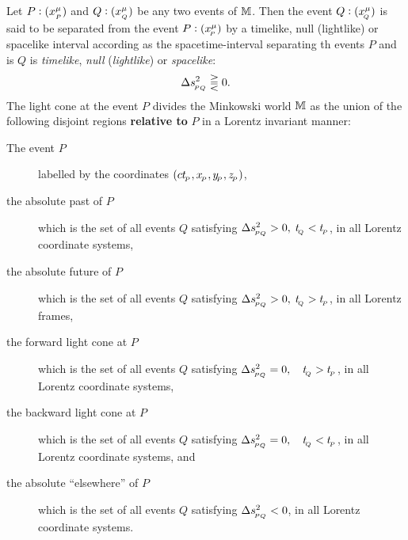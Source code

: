Let $P:(x^{{\mu}}_{_P})$  and $Q:(x^{{\mu}}_{_Q})$ be any two 
events of $\mathbb{M}$. Then the event $Q: (x^{{\mu}}_{_{\hspace*{-1.5pt}{Q}}})$ is 
said to be separated from the event $P: (x^{{\mu}}_{_{\hspace*{-1.5pt}{P}}}) $ 
by a {timelike}, {null (lightlike)} or {spacelike} interval 
according as the spacetime-interval separating  th events  
$P$ and is  $Q$ is \textsl{timelike}, \textsl{null} 
(\textsl{lightlike}) or \textsl{spacelike}:
\begin{align}\label{mw.25} 
\Delta s_{_{\hspace*{-1.5pt}{PQ}}}^2 \gtreqqless 0.
\end{align} 
The light cone at the event $P$ divides the 
Minkowski world $\mathbb{M}$ as the union of the following 
disjoint regions\textbf{ relative to} $P$ in a Lorentz 
invariant manner:

\begin{description}

\item [The event $P$] labelled by the coordinates 
$(ct_{_{\hspace*{-1.5pt}{P}}},x_{_{\hspace*{-1.5pt}{P}}},y_{_{\hspace*{-1.5pt}{P}}},z_{_{\hspace*{-1.5pt}{P}}})$, 

\item [the absolute past of $P$]  which is the set of all events $Q$   satisfying  
$\Delta s_{_{\hspace*{-1.5pt}{PQ}}}^2 > 0,\; t_{_{\hspace*{-1.5pt}{Q}}}< t_{_{\hspace*{-1.5pt}{P}}}$, in all 
Lorentz  coordinate systems,

\item [the absolute future  of $P$]  which is the set of all events $Q$ 
satisfying  $\Delta s_{_{\hspace*{-1.5pt}{PQ}}}^2 > 0,\; t_{_{\hspace*{-1.5pt}{Q}}}> 
t_{_{\hspace*{-1.5pt}{P}}}$, in all Lorentz frames,

\item [the forward light cone  at $P$]   which is the set of all events $Q$  satisfying 
$\Delta s_{_{\hspace*{-1.5pt}{PQ}}}^2 = 0, \quad t_{_{\hspace*{-1.5pt}{Q}}}>t_{_{\hspace*{-1.5pt}{P}}}$, in 
all Lorentz  coordinate systems, 

\item [the backward light cone at $P$]  which is the set of all  events 
$Q$  satisfying $\Delta s_{_{\hspace*{-1.5pt}{PQ}}}^2 = 0, \quad 
t_{_{\hspace*{-1.5pt}{Q}}}<t_{_{\hspace*{-1.5pt}{P}}}$, in all  Lorentz coordinate systems, 
and 

\item [the  absolute ``elsewhere'' of $P$]  which is the set of all   events 
$Q$ satisfying $ \Delta s_{_{\hspace*{-1.5pt}{PQ}}}^2 < 0$, in all Lorentz  
coordinate systems. 
\end{description}

